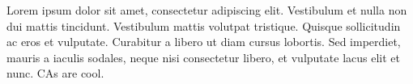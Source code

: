 Lorem ipsum dolor sit amet, consectetur adipiscing elit.
Vestibulum et nulla non dui mattis tincidunt.
Vestibulum mattis volutpat tristique.
Quisque sollicitudin ac eros et vulputate.
Curabitur a libero ut diam cursus lobortis.
Sed imperdiet, mauris a iaculis sodales, neque nisi consectetur libero, et vulputate lacus elit et nunc.
CAs are cool.

